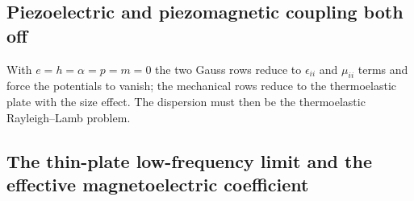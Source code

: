 \documentclass[11pt]{article}
\makeatletter
\newif\ifshowworked
\newenvironment{worked}{%
  \ifshowworked\par\smallskip\noindent\textit{Working.}\par\smallskip\else
  \setbox\z@\vbox\bgroup\fi}{\ifshowworked\par\smallskip\else\egroup\fi}
\makeatother
\begin{document}
\subsection*{Piezoelectric and piezomagnetic coupling both off}

\begin{worked}
With $e=h=\alpha=p=m=0$ the two Gauss rows reduce to $\epsilon_{ii}$ and $\mu_{ii}$ terms and force the
potentials to vanish; the mechanical rows reduce to the thermoelastic plate with the size effect. The
dispersion must then be the thermoelastic Rayleigh--Lamb problem.
\end{worked}

\subsection*{The thin-plate low-frequency limit and the effective magnetoelectric coefficient}
\end{document}
